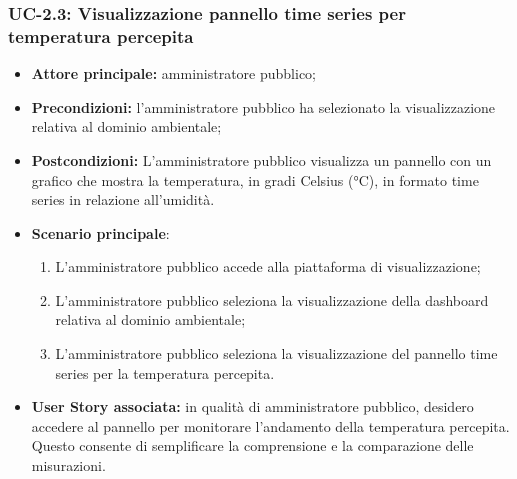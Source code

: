 \documentclass[8pt]{article}
\begin{document}
\subsubsection*{UC-2.3: Visualizzazione pannello time series per temperatura percepita}
\begin{itemize}
    \item \textbf{Attore principale:} amministratore pubblico;
    \item \textbf{Precondizioni: }l’amministratore pubblico ha selezionato la visualizzazione
        relativa al dominio ambientale;
    \item \textbf{Postcondizioni:} L’amministratore pubblico visualizza un pannello con un grafico
        che mostra la temperatura, in gradi Celsius (°C), in formato time series in relazione
        all'umidità.
    \item \textbf{Scenario principale}:
    \begin{enumerate}
    \item L’amministratore pubblico accede alla piattaforma di visualizzazione;
    \item L’amministratore pubblico seleziona la visualizzazione della dashboard relativa al dominio
        ambientale; 
    \item L’amministratore pubblico seleziona la visualizzazione del pannello time series per la temperatura percepita.
    \end{enumerate}
\item \textbf{User Story associata:} in qualità di amministratore pubblico, desidero accedere al
        pannello per monitorare l'andamento della temperatura percepita. Questo consente di semplificare la comprensione e la comparazione delle misurazioni.
\end{itemize}
\end{document}
